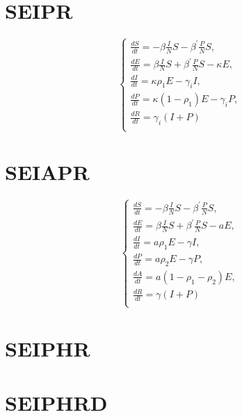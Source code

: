 \section{SEIPR}

\begin{equation*}
    \left\{\begin{array}{l}
    \frac{d S}{d t}=-\beta \frac{I}{N} S-\beta^{\prime} \frac{P}{N} S, \\
    \frac{d E}{d t}=\beta \frac{I}{N} S+\beta^{\prime} \frac{P}{N} S-\kappa E, \\
    \frac{d I}{d t}=\kappa \rho_1 E-\gamma_i I, \\
    \frac{d P}{d t}=\kappa (1 - \rho_1) E-\gamma_i P, \\
    \frac{d R}{d t}=\gamma_i(I+P)\\
    \end{array}\right.
\end{equation*}




\section{SEIAPR}
\begin{equation*}
    \left\{\begin{array}{l}
    \frac{d S}{d t}=-\beta \frac{I}{N} S-\beta^{\prime} \frac{P}{N} S, \\
    \frac{d E}{d t}=\beta \frac{I}{N} S +\beta^{\prime} \frac{P}{N} S- aE, \\
    \frac{d I}{d t}= a \rho_1 E-\gamma I, \\
    \frac{d P}{d t}= a \rho_2 E-\gamma P, \\
    \frac{d A}{d t}= a\left(1-\rho_1-\rho_2\right) E, \\
    \frac{d R}{d t}=\gamma(I+P)\\
    \end{array}\right.
\end{equation*}

\section{SEIPHR}

\section{SEIPHRD}

